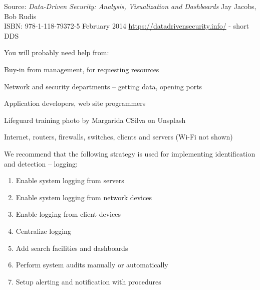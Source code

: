 \documentclass[Screen16to9,17pt]{foils}
\begin{document}
Source: \emph{Data-Driven Security: Analysis, Visualization and Dashboards} Jay Jacobs, Bob Rudis\\
ISBN: 978-1-118-79372-5 February 2014 \url{https://datadrivensecurity.info/} - short DDS





You will probably need help from:

\begin{list2}
\item Buy-in from management, for requesting resources
\item Network and security departments -- getting data, opening ports
\item Application developers, web site programmers
\end{list2}
Lifeguard training photo by Margarida CSilva on Unsplash




\begin{quote}

\end{quote}

\begin{list2}
\item Internet, routers, firewalls, switches, clients and servers (Wi-Fi not shown)
\end{list2}



We recommend that the following strategy is used for implementing identification and detection -- logging:
\begin{enumerate}
\item[\faSquareO] Enable system logging from servers
\item[\faSquareO] Enable system logging from network devices
\item[\faSquareO] Enable logging from client devices
\item[\faSquareO] Centralize logging
\item[\faSquareO] Add search facilities and dashboards
\item[\faSquareO] Perform system audits manually or automatically
\item[\faSquareO] Setup alerting and notification with procedures
\end{enumerate}
\end{document}

